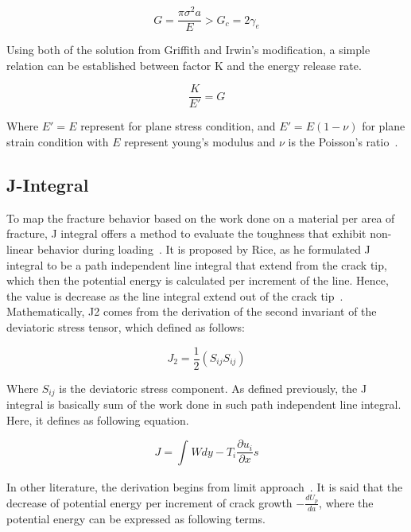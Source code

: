 \documentclass[12pt]{article}
\begin{document}
\begin{equation}
    G = \frac{\pi \sigma^2 a}{E} > G_c = 2 \gamma_e 
    \label{eq:Irwin}
\end{equation}

Using both of the solution from Griffith and Irwin's modification, a simple relation can be established between factor K and the energy release rate.

\begin{equation}
    \frac{K}{E'} = G
\end{equation}

Where $E' = E$ represent for plane stress condition, and $E' = E(1-\nu)$ for plane strain condition with $E$ represent young's modulus and $\nu$ is the Poisson's ratio~\cite{Zhu.2012}.
\subsection*{J-Integral}
\hspace{1em} To map the fracture behavior based on the work done on a material per area of fracture, J integral offers a method to evaluate the toughness
that exhibit non-linear behavior during loading~\cite{Hosford.2010}. It is proposed by Rice, as he formulated J integral to be a path independent line integral 
that extend from the crack tip, which then the potential energy is calculated per increment of the line. Hence, the value is decrease as the line integral extend out of the
crack tip~\cite{Janssen.2002}. Mathematically, J2 comes from the derivation of the second invariant of the deviatoric stress tensor, which defined as follows:

\begin{equation}
    J_2 = \frac{1}{2}(S_{ij}S_{ij})
    \label{eq:J2}
\end{equation}

Where $S_{ij}$ is the deviatoric stress component. As defined previously, the J integral is basically sum of the work done in such
path independent line integral. Here, it defines as following equation.

\begin{equation}
    J = \int_{}^{} W dy - T_{i}\frac{\partial u_i}{\partial x}s   
    \label{eq:J2}
\end{equation}

In other literature, the derivation begins from limit approach~\cite{Janssen.2002}. It is said that the decrease of potential energy
per increment of crack growth $-\frac{dU_p}{da}$, where the potential energy can be expressed as following terms.
\end{document}
